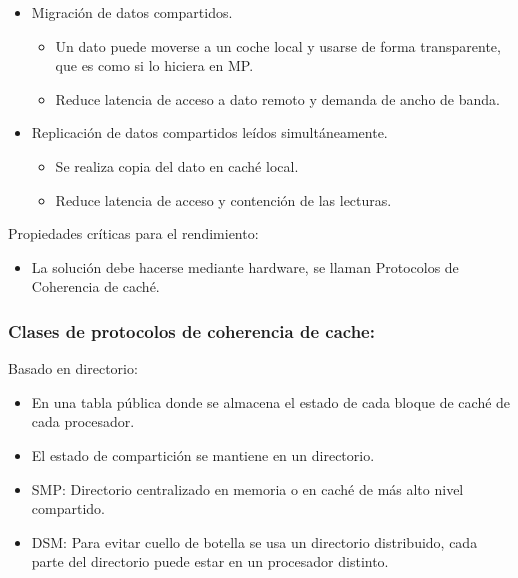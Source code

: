 \documentclass[12pt, twoside, openright]{report} %
\begin{document}
      \begin{itemize}
      
      \item
        Migración de datos compartidos.

        \begin{itemize}
        
        \item
          Un dato puede moverse a un coche local y usarse de forma
          transparente, que es como si lo hiciera en MP.
        \item
          Reduce latencia de acceso a dato remoto y demanda de ancho
          de banda.
        \end{itemize}
      \item
        Replicación de datos compartidos leídos simultáneamente.

        \begin{itemize}
        
        \item
          Se realiza copia del dato en caché local.
        \item
          Reduce latencia de acceso y contención de las lecturas.
        \end{itemize}
      \end{itemize}

      Propiedades críticas para el rendimiento:

      \begin{itemize}
      
      \item
        La solución debe hacerse mediante hardware, se llaman
        Protocolos de Coherencia de caché.
      \end{itemize}

\subsubsection{Clases de protocolos de coherencia de cache:}

   

      Basado en directorio:

      \begin{itemize}
      
      \item
        En una tabla pública donde se almacena el estado de cada
        bloque de caché de cada procesador.
      \item
        El estado de compartición se mantiene en un directorio.
      \item
        SMP: Directorio centralizado en memoria o en caché de más alto
        nivel compartido.
      \item
        DSM: Para evitar cuello de botella se usa un directorio
        distribuido, cada parte del directorio puede estar en un
        procesador distinto.
      \end{itemize}
\end{document}
